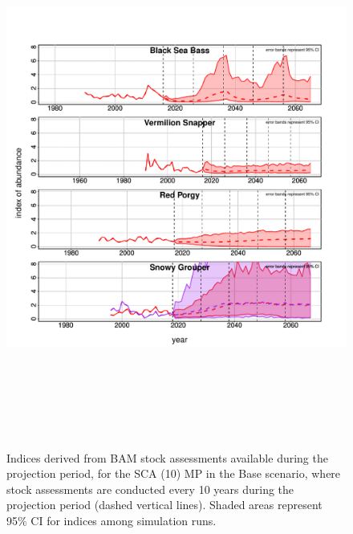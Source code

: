 \documentclass[12pt,english]{article}
\begin{document}
\begin{figure}[!ht]
\begin{center}
\includegraphics[width=6in,height=7in]{../Figs/AddInd.pdf}
\end{center}
\begin{flushleft}
\caption{Indices derived from BAM stock assessments available during the projection period, for the SCA (10) MP in the Base scenario, where stock assessments are conducted every 10 years during the projection period (dashed vertical lines). Shaded areas represent 95\% CI for indices among simulation runs.}
\label{fig:AddInd}
\end{flushleft}
\end{figure}
\end{document}
